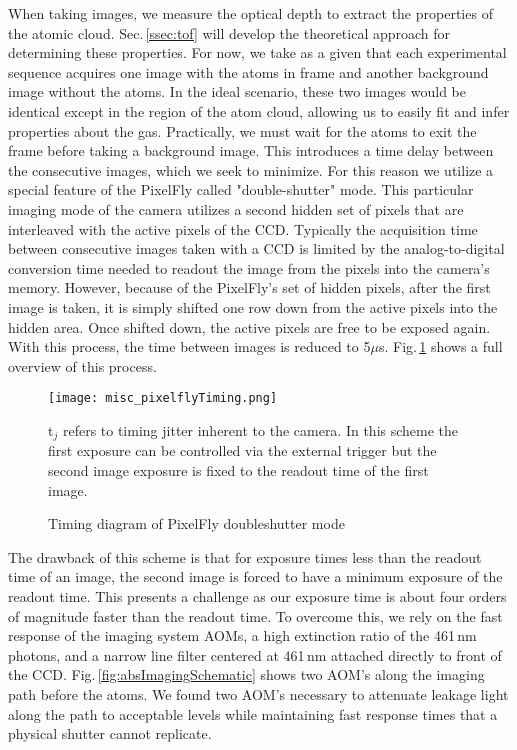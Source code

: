 When taking images, we measure the optical depth to extract the properties of the atomic cloud.
Sec.\,\ref{ssec:tof} will develop the theoretical approach for determining these properties.
For now, we take as a given that each experimental sequence acquires one image with the atoms in frame and another background image without the atoms.
In the ideal scenario, these two images would be identical except in the region of the atom cloud, allowing us to easily fit and infer properties about the gas.
Practically, we must wait for the atoms to exit the frame before taking a background image.
This introduces a time delay between the consecutive images, which we seek to minimize.
For this reason we utilize a special feature of the PixelFly called "double-shutter" mode.
This particular imaging mode of the camera utilizes a second hidden set of pixels that are interleaved with the active pixels of the CCD.
Typically the acquisition time between consecutive images taken with a CCD is limited by the analog-to-digital conversion time needed to readout the image from the pixels into the camera's memory.
However, because of the PixelFly's set of hidden pixels, after the first image is taken, it is simply shifted one row down from the active pixels into the hidden area.
Once shifted down, the active pixels are free to be exposed again.
With this process, the time between images is reduced to 5$\mu$s.
Fig.\,\ref{fig:pixelflyTiming} shows a full overview of this process.
	\begin{figure} 
		\centerline{
		\texttt{[image: misc\_pixelflyTiming.png]}}
		\caption{Timing diagram of PixelFly doubleshutter mode}{t$_j$ refers to timing jitter inherent to the camera. In this scheme the first exposure can be controlled via the external trigger but the second image exposure is fixed to the readout time of the first image.}
		\label{fig:pixelflyTiming}
	\end{figure}
The drawback of this scheme is that for exposure times less than the readout time of an image, the second image is forced to have a minimum exposure of the readout time.
This presents a challenge as our exposure time is about four orders of magnitude faster than the readout time.
To overcome this, we rely on the fast response of the imaging system AOMs, a high extinction ratio of the 461\,nm photons, and a narrow line filter centered at 461\,nm attached directly to front of the CCD.
Fig.\,\ref{fig:absImagingSchematic} shows two AOM's along the imaging path before the atoms.
We found two AOM's necessary to attenuate leakage light along the path to acceptable levels while maintaining fast response times that a physical shutter cannot replicate.

